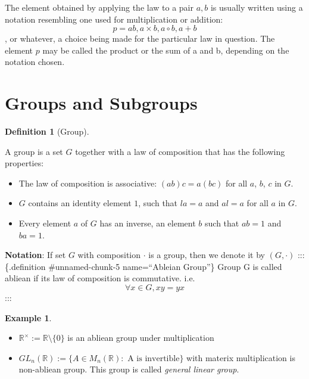 \documentclass[
]{book}
\providecommand{\tightlist}{%
  \setlength{\itemsep}{0pt}\setlength{\parskip}{0pt}}
\theoremstyle{definition}
\newtheorem{definition}{Definition}[chapter]
\theoremstyle{definition}
\newtheorem{example}{Example}[chapter]
\theoremstyle{definition}
\theoremstyle{definition}
\theoremstyle{remark}
\begin{document}
The element obtained by applying the law to a pair \(a, b\) is usually written using a notation resembling one used for multiplication or addition:
\[p = ab, a \times b, a \circ b, a + b\],
or whatever, a choice being made for the particular law in question. The element \(p\) may be called the product or the sum of a and b, depending on the notation chosen.

\hypertarget{groups-and-subgroups}{%
\section{Groups and Subgroups}\label{groups-and-subgroups}}

\begin{definition}[Group]
\protect\hypertarget{def:unnamed-chunk-4}{}\label{def:unnamed-chunk-4}

A group is a set \(G\) together with a law of composition that has the following properties:

\begin{itemize}
\tightlist
\item
  The law of composition is associative: \((ab)c = a(bc)\) for all \(a\), \(b\), \(c\) in \(G\).
\item
  \(G\) contains an identity element \(1\), such that \(la = a\) and \(al = a\) for all \(a\) in \(G\).
\item
  Every element \(a\) of \(G\) has an inverse, an element \(b\) such that \(ab = 1\) and \(ba = 1\).
\end{itemize}

\end{definition}

\textbf{Notation}: If set \(G\) with composition \(\cdot\) is a group, then we denote it by \((G,\cdot)\)
::: \{.definition \#unnamed-chunk-5 name=``Ableian Group''\}
Group G is called abliean if its law of composition is commutative. i.e.
\[\forall x\in G, xy=yx\]
:::

\begin{example}
\protect\hypertarget{exm:unnamed-chunk-6}{}\label{exm:unnamed-chunk-6}\leavevmode

\begin{itemize}
\tightlist
\item
  \(\mathbb{R}^\times:=\mathbb{R}\setminus \{0\}\) is an abliean group under multiplication
\item
  \(GL_n(\mathbb{R}):=\{A\in M_n(\mathbb{R}): \text{ A is invertible}\}\) with materix multiplication is non-abliean group. This group is called \emph{general linear group}.
\end{itemize}

\end{example}
\end{document}
